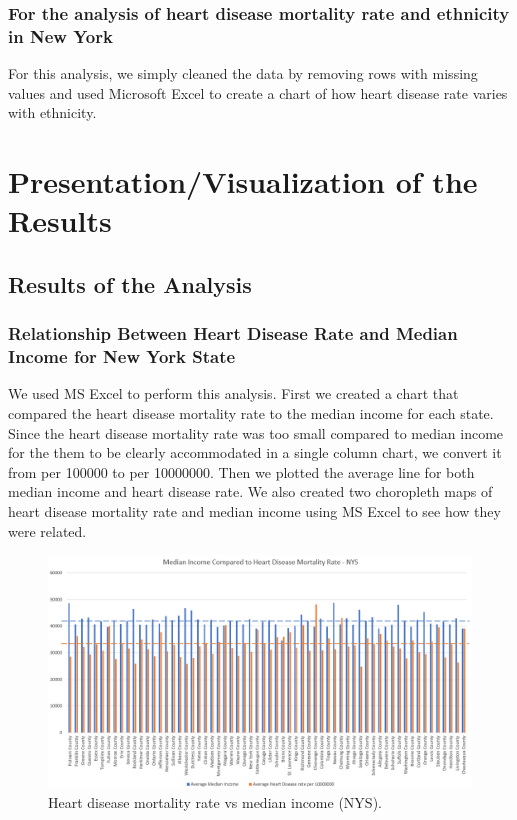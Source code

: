 \documentclass[journal,12pt,onecolumn]{IEEEtran}
\begin{document}
\subsubsection{For the analysis of heart disease mortality rate and ethnicity in New York}
For this analysis, we simply cleaned the data by removing rows with missing values and used Microsoft Excel to create a chart of how heart disease rate varies with ethnicity.


\section{Presentation/Visualization of the Results}
\subsection{Results of the Analysis}
\subsubsection{Relationship Between Heart Disease Rate and Median Income for New York State}
We used MS Excel to perform this analysis.
First we created a chart that compared the heart disease mortality rate to the median income for each state.
Since the heart disease mortality rate was too small compared to median income for the them to be clearly accommodated in a single column chart, we convert it from per 100000 to per 10000000.
Then we plotted the average line for both median income and heart disease rate.
We also created two choropleth maps of heart disease mortality rate and median income using MS Excel to see how they were related.

\begin{figure}[H]
\centering
\includegraphics[width=\textwidth]{figures/column.PNG}
\caption{Heart disease mortality rate vs median income (NYS).}
\label{fig:col1}
\end{figure}
\end{document}
